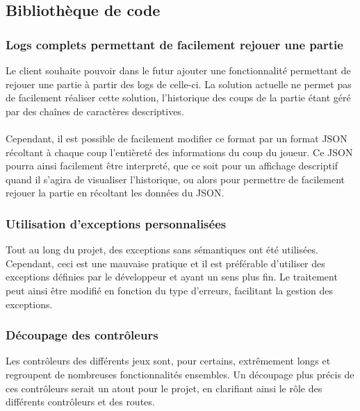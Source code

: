 \documentclass{article}
\begin{document}
        \subsection{Bibliothèque de code}

            \subsubsection{Logs complets permettant de facilement rejouer une partie}

                Le client souhaite pouvoir dans le futur ajouter une fonctionnalité permettant de rejouer une partie à partir des logs de celle-ci. La solution actuelle ne permet pas de facilement réaliser cette solution, l'historique des coups de la partie étant géré par des chaînes de caractères descriptives.\\
                \\
                \indent Cependant, il est possible de facilement modifier ce format par un format JSON récoltant à chaque coup l'entièreté des informations du coup du joueur. Ce JSON pourra ainsi facilement être interpreté, que ce soit pour un affichage descriptif quand il s'agira de visualiser l'historique, ou alors pour permettre de facilement rejouer la partie en récoltant les données du JSON.

            \subsubsection{Utilisation d'exceptions personnalisées}

                Tout au long du projet, des exceptions sans sémantiques ont été utilisées. Cependant, ceci est une mauvaise pratique et il est préférable d'utiliser des exceptions définies par le développeur et ayant un sens plus fin. Le traitement peut ainsi être modifié en fonction du type d'erreurs, facilitant la gestion des exceptions.

            \subsubsection{Découpage des contrôleurs}

                Les contrôleurs des différents jeux sont, pour certains, extrêmement longs et regroupent de nombreuses fonctionnalités ensembles. Un découpage plus précis de ces contrôleurs serait un atout pour le projet, en clarifiant ainsi le rôle des différents contrôleurs et des routes. 
\end{document}
